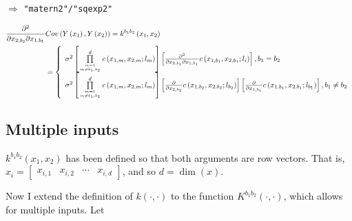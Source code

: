 \documentclass{sfuthesis}
\begin{document}
\bigskip
{} $\Rightarrow$ \texttt{"matern2"/"sqexp2"}

\begin{align}
    \frac{{{\partial ^2}}}{{\partial {x_{ {2,b_2} }}\partial {x_{ {1,b_1} }}}} &Cov\left( {Y\left( {{x_1}} \right),Y\left( {{x_2}} \right)} \right) = {k^{b_1 b_2}}\left( {{x_1},{x_2}} \right)\\
 &= \left\{ \begin{array}{l}
{\sigma ^2}\left[ {\prod\limits_{m = 1\atop
m \ne b_1, b_2}^d {c\left( {{x_{1,m} },x_{2, m};{l_m}} \right)} } \right]\left[ {\frac{{{\partial ^2}}}{{\partial {x_{ {2, b_1} }}\partial {x_{ {1, b_1} }}}}c\left( {{x_{ {1, b_1} }},{x_{ {2,b_1} }};{l_i}} \right)} \right], b_1 = b_2\\
{\sigma ^2}\left[ {\prod\limits_{m = 1\atop
m \ne b_1, b_2}^d {c\left( {{x_{1,m} },x_{2, m};{l_m}} \right)} } \right]\left[ {\frac{\partial }{{\partial {x_{ {2, b_2} }}}}c\left( {{x_{ {1,b_2} }},{x_{ {2, b_2} }};{l_{b_2} }} \right)} \right]\left[ {\frac{\partial }{{\partial {x_{ {1, b_1} }}}}c\left( {{x_{ {1, b_1} }},{x_{ {2, b_1} }};{l_{b_1}}} \right)} \right], b_1 \ne b_2
    \end{array} \right.
\end{align}


\pagebreak

\subsection{Multiple inputs}

$k^{b_1b_2}(x_1, x_2)$ has been defined so that both arguments are row vectors. 
That is,  
  ${x_i} = \left[ {\begin{array}{*{20}{c}}
{{x_{ {i,1} }}}&{{x_{ {i,2} }}}& \cdots &{{x_{ {i,d} }}}
\end{array}} \right]$, and so $d = \dim(x)$. 

Now I extend the definition of $k(\cdot, \cdot)$ to the function $K^{b_1b_2}(\cdot, \cdot)$, which allows for multiple inputs. 
Let 
\end{document}
